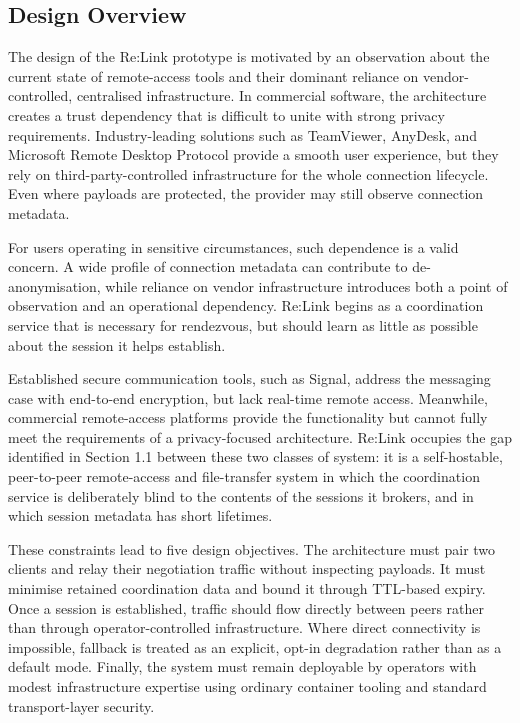 \documentclass[12pt,a4paper]{article}
\begin{document}
\subsection{Design Overview}

The design of the Re:Link prototype is motivated by an observation about the current state of remote-access tools and their dominant reliance on vendor-controlled, centralised infrastructure. In commercial software, the architecture creates a trust dependency that is difficult to unite with strong privacy requirements. Industry-leading solutions such as TeamViewer, AnyDesk, and Microsoft Remote Desktop Protocol provide a smooth user experience, but they rely on third-party-controlled infrastructure for the whole connection lifecycle. Even where payloads are protected, the provider may still observe connection metadata.

For users operating in sensitive circumstances, such dependence is a valid concern. A wide profile of connection metadata can contribute to de-anonymisation, while reliance on vendor infrastructure introduces both a point of observation and an operational dependency. Re:Link begins as a coordination service that is necessary for rendezvous, but should learn as little as possible about the session it helps establish.

Established secure communication tools, such as Signal, address the messaging case with end-to-end encryption, but lack real-time remote access. Meanwhile, commercial remote-access platforms provide the functionality but cannot fully meet the requirements of a privacy-focused architecture. Re:Link occupies the gap identified in Section 1.1 between these two classes of system: it is a self-hostable, peer-to-peer remote-access and file-transfer system in which the coordination service is deliberately blind to the contents of the sessions it brokers, and in which session metadata has short lifetimes.

These constraints lead to five design objectives. The architecture must pair two clients and relay their negotiation traffic without inspecting payloads. It must minimise retained coordination data and bound it through TTL-based expiry. Once a session is established, traffic should flow directly between peers rather than through operator-controlled infrastructure. Where direct connectivity is impossible, fallback is treated as an explicit, opt-in degradation rather than as a default mode. Finally, the system must remain deployable by operators with modest infrastructure expertise using ordinary container tooling and standard transport-layer security.
\end{document}
